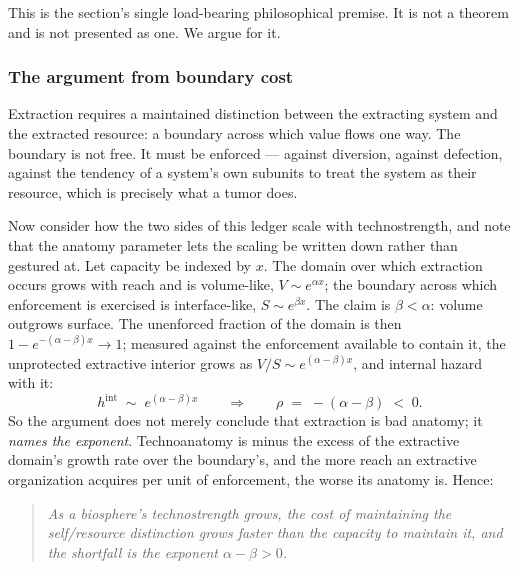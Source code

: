 \documentclass[11pt]{article}
\numberwithin{equation}{section}
\theoremstyle{plain}
\theoremstyle{definition}
\theoremstyle{remark}
\begin{document}
This is the section's single load-bearing philosophical premise. It is
not a theorem and is not presented as one. We argue for it.

\subsubsection{The argument from boundary cost}\label{gr:subsub:boundary}

Extraction requires a maintained distinction between the extracting
system and the extracted resource: a boundary across which value flows
one way. The boundary is not free. It must be enforced --- against
diversion, against defection, against the tendency of a system's own
subunits to treat the system as their resource, which is precisely what
a tumor does.

Now consider how the two sides of this ledger scale with technostrength,
and note that the anatomy parameter lets the scaling be written down
rather than gestured at. Let capacity be indexed by $x$. The domain over
which extraction occurs grows with reach and is volume-like,
$V\sim e^{\alpha x}$; the boundary across which enforcement is exercised
is interface-like, $S\sim e^{\beta x}$. The claim is
$\beta<\alpha$: volume outgrows surface. The unenforced fraction of the
domain is then $1-e^{-(\alpha-\beta)x}\to1$; measured against the
enforcement available to contain it, the unprotected extractive
interior grows as $V/S\sim e^{(\alpha-\beta)x}$, and internal hazard
with it:
\begin{equation}\label{gr:eq:rhoextract}
h^{\mathrm{int}}\;\sim\;e^{(\alpha-\beta)x}
\qquad\Longrightarrow\qquad
\rho\;=\;-(\alpha-\beta)\;<\;0 .
\end{equation}
So the argument does not merely conclude that extraction is bad
anatomy; it \emph{names the exponent}. Technoanatomy is minus the excess
of the extractive domain's growth rate over the boundary's, and the more
reach an extractive organization acquires per unit of enforcement, the
worse its anatomy is. Hence:

\begin{quote}
\emph{As a biosphere's technostrength grows, the cost of maintaining the
self/resource distinction grows faster than the capacity to maintain
it, and the shortfall is the exponent $\alpha-\beta>0$.}
\end{quote}
\end{document}
